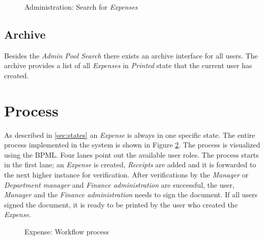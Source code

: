 \begin{figure}[H]
    \centering
    \caption{Administration: Search for \textit{Expenses}}
    \label{fig:admin-search}
\end{figure}

\subsection{Archive}
Besides the \textit{Admin Pool Search} there exists an archive interface for all users. The archive provides a list of all \textit{Expenses} in \textit{Printed} state that the current user has created.  

\section{Process}
\label{sec:process}
As described in \ref{sec:states} an \textit{Expense} is always in one specific state. The entire process implemented in the system is shown in Figure \ref{fig:process-diagram}. The process is visualized using the BPML. Four lanes point out the available user roles. The process starts in the first lane; an \textit{Expense} is created, \textit{Receipts} are added and it is forwarded to the next higher instance for verification. After verifications by the \textit{Manager} or \textit{Department manager} and \textit{Finance administration} are successful, the user, \textit{Manager} and the \textit{Finance administration} needs to sign the document. If all users signed the document, it is ready to be printed by the user who created the \textit{Expense}.

\begin{figure}[H]
    \centering
    \caption{Expense: Workflow process}
    \label{fig:process-diagram}
\end{figure}

